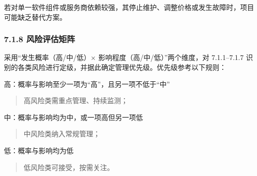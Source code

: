 
若对单一软件组件或服务商依赖较强，其停止维护、调整价格或发生故障时，项目可能缺乏替代方案。

\subsubsection{7.1.8 风险评估矩阵}\label{ux98ceux9669ux8bc4ux4f30ux77e9ux9635}

采用``发生概率（高/中/低）× 影响程度（高/中/低）''两个维度，对 7.1.1--7.1.7 识别的各类风险进行定级，并据此确定管理优先级。优先级参考以下规则：

高：概率与影响至少一项为``高''，且另一项不低于``中''

\begin{quote}
高风险类需重点管理、持续监测；
\end{quote}

中：概率与影响均为中，或一项高但另一项低

\begin{quote}
中风险类纳入常规管理；
\end{quote}

低：概率与影响均为低

\begin{quote}
低风险类可接受，按需关注。
\end{quote}

